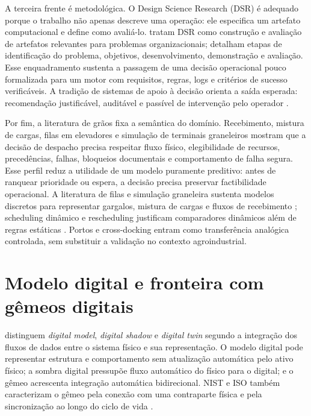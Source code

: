 \documentclass[
  12pt,
  oneside,
  a4paper,
  sumario=tradicional,
  brazil
]{abntex2}
\begin{document}
A terceira frente \'e metodol\'ogica. O Design Science Research (DSR) \'e adequado porque o trabalho n\~ao apenas descreve uma opera\c{c}\~ao: ele especifica um artefato computacional e define como avali\'a-lo. \textcite{hevnerDesignScienceInformation2004a} tratam DSR como constru\c{c}\~ao e avalia\c{c}\~ao de artefatos relevantes para problemas organizacionais; \textcite{peffersDesignScienceResearch2007aa} detalham etapas de identifica\c{c}\~ao do problema, objetivos, desenvolvimento, demonstra\c{c}\~ao e avalia\c{c}\~ao. Esse enquadramento sustenta a passagem de uma decis\~ao operacional pouco formalizada para um motor com requisitos, regras, logs e crit\'erios de sucesso verific\'aveis. A tradi\c{c}\~ao de sistemas de apoio \`a decis\~ao orienta a sa\'ida esperada: recomenda\c{c}\~ao justific\'avel, audit\'avel e pass\'ivel de interven\c{c}\~ao pelo operador \parencite{vanderheydenDecisionSupportSystem1985a, mardanehDecisionSupportSystem2021a}.

Por fim, a literatura de gr\~aos fixa a sem\^antica do dom\'inio. Recebimento, mistura de cargas, filas em elevadores e simula\c{c}\~ao de terminais graneleiros mostram que a decis\~ao de despacho precisa respeitar fluxo f\'isico, elegibilidade de recursos, preced\^encias, falhas, bloqueios documentais e comportamento de falha segura. Esse perfil reduz a utilidade de um modelo puramente preditivo: antes de ranquear prioridade ou espera, a decis\~ao precisa preservar factibilidade operacional. A literatura de filas e simula\c{c}\~ao graneleira sustenta modelos discretos para representar gargalos, mistura de cargas e fluxos de recebimento \parencite{boulandTruckQueuesCountry1967a, leblancQueuingModelSimulation1978a, r.berrutoAnalyzingReceivingOperation2001a, t.j.herrmanUseSimulationModel2002a, m.e.a.inglesEffectsGrainreceivingSystem2006a, silvaSimulationToolsetModeling2012a, turnerDiscreteEventSimulation2019a, fioroniFarmPortSimulation2015a}; scheduling din\^amico e rescheduling justificam comparadores din\^amicos al\'em de regras est\'aticas \parencite{langeDispatchingStrategiesDrayage2018a, dasilvaIntegrationMachineLearning2023}. Portos e cross-docking entram como transfer\^encia anal\'ogica controlada, sem substituir a valida\c{c}\~ao no contexto agroindustrial.

\section{Modelo digital e fronteira com g\^emeos digitais}

\textcite{kritzingerDigitalTwinManufacturing2018} distinguem \textit{digital model},
\textit{digital shadow} e \textit{digital twin} segundo a integra\c{c}\~ao dos fluxos de
dados entre o sistema f\'isico e sua representa\c{c}\~ao. O modelo digital pode representar
estrutura e comportamento sem atualiza\c{c}\~ao autom\'atica pelo ativo f\'isico; a sombra
digital pressup\~oe fluxo autom\'atico do f\'isico para o digital; e o g\^emeo acrescenta
integra\c{c}\~ao autom\'atica bidirecional. NIST e ISO tamb\'em caracterizam o g\^emeo pela
conex\~ao com uma contraparte f\'isica e pela sincroniza\c{c}\~ao ao longo do ciclo de vida
\parencite{nistDigitalTwinsEssentialElements2026,isoSmartManufacturingWhitePaper2021}.
\end{document}

